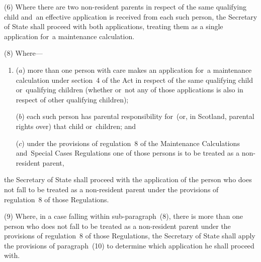 \documentclass[12pt,a4paper]{article}
\begin{document}
(6) Where there are two non-resident parents in respect of the same qualifying child and~an effective application is received from each such person, the Secretary of State shall proceed with both applications, treating them as a single application for~a maintenance calculation.


(8) Where—
\begin{enumerate}\item[]
($a$) more than one person with care makes an application for~a maintenance calculation under section~4 of the Act in respect of the same qualifying child or~qualifying children (whether or~not any of those applications is also in respect of other qualifying children);

($b$) each such person has parental responsibility for~(or, in Scotland, parental rights over) that child or~children; and

($c$) under the provisions of regulation~8 of the Maintenance Calculations and~Special Cases Regulations one of those persons is to be treated as a non-resident parent,
\end{enumerate}
the Secretary of State shall proceed with the application of the person who does not fall to be treated as a non-resident parent under the provisions of regulation~8 of those Regulations.

(9) Where, in a case falling within sub-paragraph~(8), there is more than one person who does not fall to be treated as a non-resident parent under the provisions of regulation~8 of those Regulations, the Secretary of State shall apply the provisions of paragraph~(10) to determine which application he shall proceed with.
\end{document}
